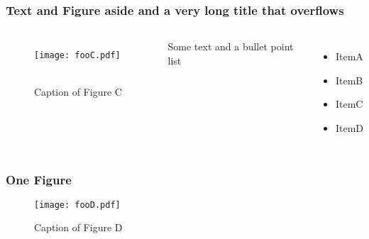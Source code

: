 \documentclass[handout]{beamer}
\begin{document}
\begin{frame}
	\frametitle{Text and Figure aside and a very long title that overflows}
	\begin{columns}[]
			\centering
			\begin{figure}
				\texttt{[image: fooC.pdf]} \
				\caption{Caption of Figure C}
			\end{figure}
			Some text and a bullet point list
			\begin{itemize}
				\item ItemA
				\item ItemB
				\item ItemC
				\item ItemD
			\end{itemize}			
	\end{columns}
\end{frame}


\begin{frame}
	\frametitle{One Figure}
	\bigskip
	\begin{figure}
		\texttt{[image: fooD.pdf]}
		\caption{Caption of Figure D}
	\end{figure}
\end{frame}

 
\end{document}
